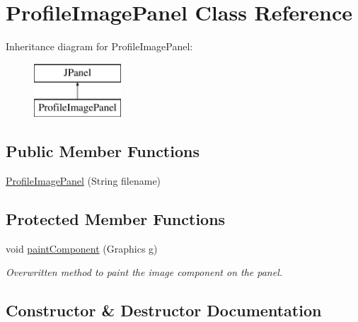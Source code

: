 \hypertarget{class_profile_image_panel}{}\section{Profile\+Image\+Panel Class Reference}
\label{class_profile_image_panel}
Inheritance diagram for Profile\+Image\+Panel\+:\begin{figure}[H]
\begin{center}
\leavevmode
\includegraphics[height=2.000000cm]{class_profile_image_panel}
\end{center}
\end{figure}
\subsection*{Public Member Functions}
\begin{DoxyCompactItemize}
\item 
\hyperlink{class_profile_image_panel_a97acf7180ff6c375a9d310c0d09828db}{Profile\+Image\+Panel} (String filename)
\end{DoxyCompactItemize}
\subsection*{Protected Member Functions}
\begin{DoxyCompactItemize}
\item 
\mbox{\label{class_profile_image_panel_ab1afa1f852a9f304d34c25a05f47f937}} 
void \hyperlink{class_profile_image_panel_ab1afa1f852a9f304d34c25a05f47f937}{paint\+Component} (Graphics g)
\begin{DoxyCompactList}\small\item\em Overwritten method to paint the image component on the panel. \end{DoxyCompactList}\end{DoxyCompactItemize}


\subsection{Constructor \& Destructor Documentation}
\mbox{\label{class_profile_image_panel_a97acf7180ff6c375a9d310c0d09828db}} 
